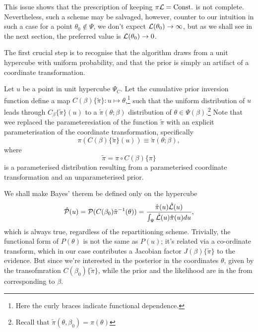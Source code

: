 \documentclass[usenatbib]{mnras}
\begin{document}
This issue shows that the prescription of keeping \(\pi {\cal L} =
	\text{Const.}\) is not complete. Nevertheless, such a scheme may be
salvaged, however, counter to our intuition in such a case for a
point \(\theta_{0} \notin \Psi\), we don't expect \({\cal L}(\theta_{0})
	\rightarrow \infty\), but as we shall see in the next section, the preferred value
is \({\cal L}(\theta_{0}) \rightarrow 0\).

The first crucial step is to recognise that the algorithm draws
from a unit hypercube with uniform probability, and that the prior
is simply an artifact of a coordinate transformation. 

Let \(u\) be a point in unit hypercube \(\Psi_{C}\). Let the cumulative
prior inversion function define a map \(C(\beta)\lbrace \tilde{\pi}\rbrace:u
	\mapsto \theta\),\footnote{Here the curly braces indicate functional dependence.} such that the uniform distribution of \(u\) leads
through \(C_{\beta}\{\tilde{\pi}\}(u)\) to a \(\tilde{\pi}(\theta;\beta)\) distribution of \(\theta
	\in\Psi(\beta)\).\footnote{Recall that \(\tilde{\pi}(\theta, \beta_{0}) = \pi(\theta)\)} Note that wee
replaced the parameteresiation of the function \(\tilde{\pi}\) with an
explicit parameterisation of the coordinate transformation, specifically
\begin{equation}
  \pi(C(\beta)\{\tilde{\pi}\}(u)) \equiv \tilde{\pi}(\theta; \beta),
\end{equation}
where 
\begin{equation}
  \tilde{\pi} =  \pi \circ C(\beta) \{ \pi \} 
\end{equation}
is a parameterised distribution resulting from a parameterised
coordinate transformation and an unparameterised prior.

We shall make Bayes' therem be defined only on the hypercube
\begin{equation}
{\cal \hat{P}}(u) = {\cal P}(C(\beta_{0}){\tilde{\pi}}^{-1}(\theta)) = \frac{\hat{\pi} (u) {\cal \hat{L}}(u)}{\int_{\Psi}{\cal \hat{L}}(u) \hat{\pi}(u) du},
\end{equation}
which is always true, regardless of the repartitioning
scheme. Trivially, the functional form of \(P(\theta)\) is not the same
as \(P(u)\); it's related via a co-ordinate transform, which in our
case contributes a Jacobian factor \(J(\beta)\{\tilde{\pi}\}\) to the
evidence. But since we're interested in the posterior in the
coordinates \(\theta\), given by the transofmration \(C(\beta_{0})\{\tilde{\pi}\}\),
while the prior and the likelihood are in the from corresponding
to \(\beta\).
\end{document}

